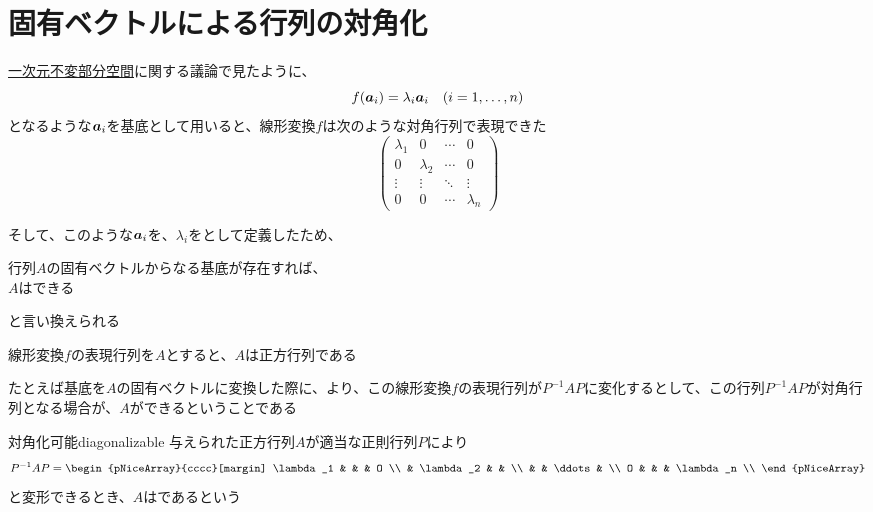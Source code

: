 \documentclass[../../../topic_linear-algebra]{subfiles}
\begin{document}
\sectionline
\section{固有ベクトルによる行列の対角化}

\hyperref[sec:1d-invariant-subspaces]{一次元不変部分空間}に関する議論で見たように、
\begin{equation*}
  f(\vb*{a}_i) = \lambda_i \vb*{a}_i \quad (i = 1, \dots, n)
\end{equation*}
となるような$\vb*{a}_i$を基底として用いると、線形変換$f$は次のような対角行列で表現できた
\begin{equation*}
  \begin{pmatrix}
    \lambda_1 & 0         & \cdots & 0         \\
    0         & \lambda_2 & \cdots & 0         \\
    \vdots    & \vdots    & \ddots & \vdots    \\
    0         & 0         & \cdots & \lambda_n
  \end{pmatrix}
\end{equation*}

そして、このような$\vb*{a}_i$を、$\lambda_i$をとして定義したため、
\begin{shaded}
  行列$A$の固有ベクトルからなる基底が存在すれば、\\
  $A$はできる
\end{shaded}
と言い換えられる

\sectionline

線形変換$f$の表現行列を$A$とすると、$A$は正方行列である

\br

たとえば基底を$A$の固有ベクトルに変換した際に、より、この線形変換$f$の表現行列が$P^{-1}AP$に変化するとして、この行列$P^{-1}AP$が対角行列となる場合が、$A$ができるということである

\begin{definition}{対角化可能}{diagonalizable}
  与えられた正方行列$A$が適当な正則行列$P$により
  \begin{equation*}
    P^{-1}AP = \begin{pNiceArray}{cccc}[margin]
      \lambda_1 & & & O \\
      & \lambda_2 & & \\
      & & \ddots & \\
      O & & & \lambda_n \\
    \end{pNiceArray}
  \end{equation*}
  と変形できるとき、$A$はであるという
\end{definition}
\end{document}
